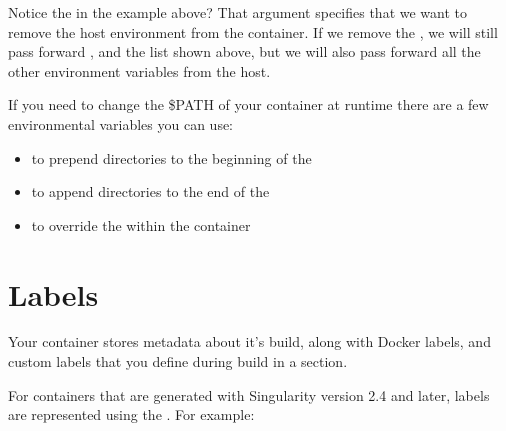 \documentclass[letterpaper,10pt,english]{sphinxmanual}
\begin{document}
Notice the  in the example above? That argument specifies that we want
to remove the host environment from the container. If we remove the ,
we will still pass forward , and the list shown above, but we will
also pass forward all the other environment variables from the host.

If you need to change the \$PATH of your container at runtime there are
a few environmental variables you can use:
\begin{itemize}
\item {} 
 to prepend directories to the beginning of the

\item {} 
 to append directories to the end of the

\item {} 
 to override the  within the container

\end{itemize}


\section{Labels}
\label{\detokenize{environment_and_metadata:labels}}
Your container stores metadata about it’s build, along with Docker
labels, and custom labels that you define during build in a  section.

For containers that are generated with Singularity version 2.4 and
later, labels are represented using the . For
example:
\end{document}
